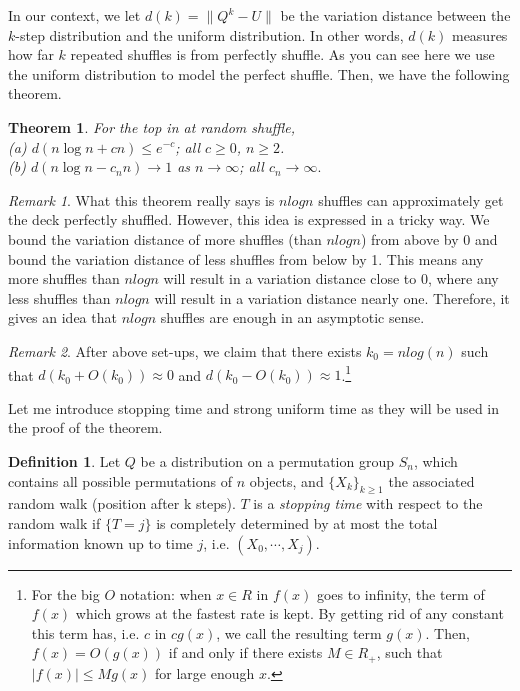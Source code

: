 \documentclass[12pt]{article}
\theoremstyle{plain}
\newtheorem{theorem}{Theorem}
\theoremstyle{definition}
\newtheorem{definition}{Definition}
\theoremstyle{remark}
\newtheorem*{remark}{Remark}
\begin{document}
In our context, we let $d(k)=\big\|Q^k-U\big\|$ be the variation distance between the $k$-step distribution and the uniform distribution. In other words, $d(k)$ measures how far $k$ repeated shuffles is from perfectly shuffle. As you can see here we use the uniform distribution to model the perfect shuffle. Then, we have the following theorem.

\begin{theorem} \cite[Theorem~1 on \pno~335]{1.1}
For the top in at random shuffle,\\
(a) $d(n\log n + cn)\leq e^{-c}$; all $c\geq 0$, $n \geq 2$.\\
(b) $d(n\log n - c_nn)\rightarrow 1$ as $n\rightarrow \infty$; all $c_n \rightarrow \infty.$
\end{theorem}

\begin{remark}
What this theorem really says is $nlogn$ shuffles can approximately get the deck perfectly shuffled. However, this idea is expressed in a tricky way. We bound the variation distance of more shuffles (than $nlogn$) from above by 0 and bound the variation distance of less shuffles from below by 1. This means any more shuffles than $nlogn$ will result in a variation distance close to 0, where any less shuffles than $nlogn$ will result in a variation distance nearly one. Therefore, it gives an idea that $nlogn$ shuffles are enough in an asymptotic sense.
\end{remark}

\begin{remark}
After above set-ups, we claim that there exists $k_0=nlog(n)$ such that $d(k_0+O(k_0))\approx0$ and $d(k_0-O(k_0))\approx1$.\footnote{For the big $O$ notation: when $x\in R$ in $f(x)$ goes to infinity, the term of $f(x)$ which grows at the fastest rate is kept. By getting rid of any constant this term has, i.e. $c$ in $cg(x)$, we call the resulting term $g(x)$. Then, $f(x)=O(g(x))$ if and only if there exists $M \in R_+$, such that  $|f(x)|\leq Mg(x)$ for large enough $x$.  } 
\end{remark}

Let me introduce stopping time and strong uniform time as they will be used in the proof of the theorem.
\begin{definition}
  Let $Q$ be a distribution on a permutation group $S_n$, which contains all possible permutations of $n$ objects, and $\{X_k\}_{k\geq1}$ the associated random walk (position after k steps). $T$ is a \textit{stopping time} with respect to the random walk if $\{T=j\}$ is completely determined by at most the total information known up to time $j$, i.e. $(X_0,\cdots,X_j)$.
\end{definition}
\end{document}
